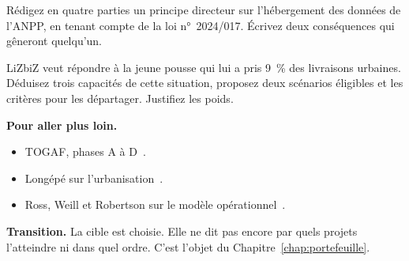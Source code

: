 \begin{boxexo}[title={\ding{45}\quad Exercice~10.3. Un principe \niveaumoyen}]
Rédigez en quatre parties un principe directeur sur l'hébergement des données de l'ANPP, en tenant compte de la loi n°~2024/017. Écrivez deux conséquences qui gêneront quelqu'un.
\end{boxexo}

\begin{boxexo}[title={\ding{45}\quad Exercice~10.4. La cible de LiZbiZ \niveauexpert}]
LiZbiZ veut répondre à la jeune pousse qui lui a pris 9~\% des livraisons urbaines. Déduisez trois capacités de cette situation, proposez deux scénarios éligibles et les critères pour les départager. Justifiez les poids.
\end{boxexo}

\bigskip

\begin{boxinfo}
\textbf{Pour aller plus loin.}
\begin{itemize}
    \item TOGAF, phases A à D~\cite{togaf10}.
    \item Longépé sur l'urbanisation~\cite{longepe2001}.
    \item Ross, Weill et Robertson sur le modèle opérationnel~\cite{ross2006}.
\end{itemize}
\end{boxinfo}

\begin{boxinfo}
\textbf{Transition.} La cible est choisie. Elle ne dit pas encore par quels projets l'atteindre ni dans quel ordre. C'est l'objet du Chapitre~\ref{chap:portefeuille}.
\end{boxinfo}
